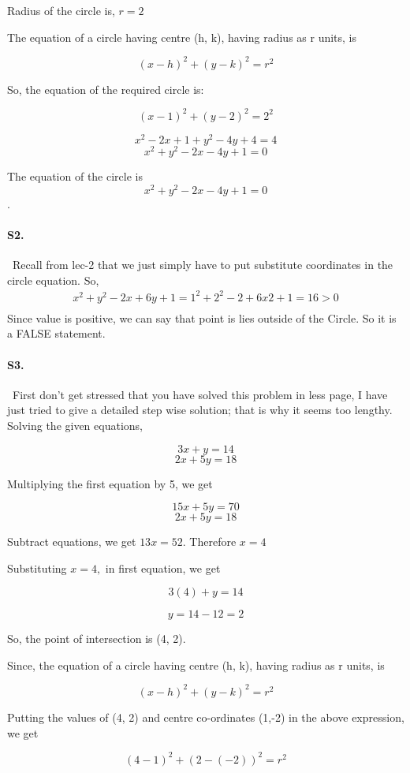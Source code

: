\documentclass{article}
\begin{document}
Radius of the circle is, $r = 2$

The equation of a circle having centre (h, k), having radius as r units, is

$$(x - h)^2 + (y - k)^2 = r^2$$

So, the equation of the required circle is:

$$(x - 1)^2 + (y - 2)^2 = 2^2$$

$$x^2 - 2x + 1 + y^2 - 4y + 4 = 4$$
$$ x^2 + y^2 - 2x - 4y + 1 = 0$$

The equation of the circle is $$x^2 + y^2 - 2x - 4y + 1 = 0$$.
\paragraph{S2.}\
Recall from lec-2 that we just simply have to put substitute coordinates in the circle equation. So,
\begin{align*}
    x^2 + y^2 - 2x + 6y + 1 = 1^2+2^2-2+6x2+1=16>0\\
\end{align*} 
Since value is positive, we can say that point is lies outside of the Circle. So it is a FALSE statement.
\paragraph{S3.}\
First don't get stressed that you have solved this problem in less page, I have just tried to give a detailed step wise solution; that is why it seems too lengthy.  Solving the given equations,

$$3x + y = 14$$
$$2x + 5y = 18$$

Multiplying the first equation by 5, we get

$$15x + 5y = 70$$
$$2x + 5y = 18$$

Subtract equations, we get $13 x = 52$. Therefore $x = 4$

Substituting $x = 4,$ in first equation, we get

$$3 (4) + y = 14$$

$$y = 14 - 12 = 2$$

So, the point of intersection is (4, 2).

Since, the equation of a circle having centre (h, k), having radius as r units, is

$$(x - h)^2 + (y - k)^2 = r^2$$

Putting the values of (4, 2) and centre co-ordinates (1,-2) in the above expression, we get

$$(4 - 1)^2 + (2 - (-2))^2 = r^2$$
\end{document}
